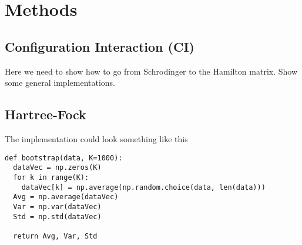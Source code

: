 \section{Methods} \label{sec:methods}

\subsection{Configuration Interaction (CI)}
Here we need to show how to go from Schrodinger to the Hamilton matrix. Show some general implementations.

\subsection{Hartree-Fock}

The implementation could look something like this
\lstset{basicstyle=\scriptsize}
\begin{lstlisting}
def bootstrap(data, K=1000):
  dataVec = np.zeros(K)
  for k in range(K):
    dataVec[k] = np.average(np.random.choice(data, len(data)))
  Avg = np.average(dataVec)
  Var = np.var(dataVec)
  Std = np.std(dataVec)
    
  return Avg, Var, Std
\end{lstlisting}
